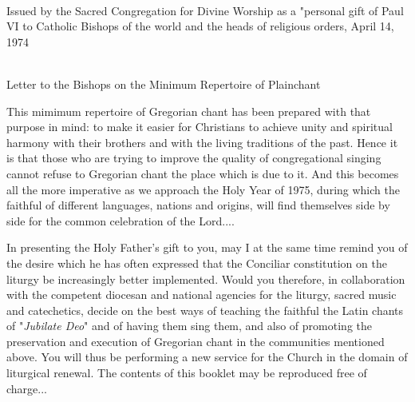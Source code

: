 \documentclass[12pt, a5paper]{book}
\begin{document}
\def\greinitialformat#1{%
{\fontsize{43}{43}\selectfont #1}%
}


\begin{center}
\\
\vspace{1in}

{\large Issued by the Sacred Congregation for Divine Worship as a "personal gift of Paul VI to Catholic Bishops of the world and the heads of religious orders, April 14, 1974}\\

\end{center}
\newpage
\begin{center}
\\
\vspace{5mm}
Letter to the Bishops on the Minimum Repertoire of Plainchant
\end{center}

This mimimum repertoire of Gregorian chant has been prepared with that purpose in mind: to make it easier for Christians to achieve unity and spiritual harmony with their brothers and with the living traditions of the past. Hence it is that those who are trying to improve the quality of congregational singing cannot refuse to Gregorian chant the place which is due to it. And this becomes all the more imperative as we approach the Holy Year of 1975, during which the faithful of different languages, nations and origins, will find themselves side by side for the common celebration of the Lord....
\par
In presenting the Holy Father's gift to you, may I at the same time remind you of the desire which he has often expressed that the Conciliar constitution on the liturgy be increasingly better implemented. Would you therefore, in collaboration with the competent diocesan and national agencies for the liturgy, sacred music and catechetics, decide on the best ways of teaching the faithful the Latin chants of "{\it Jubilate Deo}" and of having them sing them, and also of promoting the preservation and execution of Gregorian chant in the communities mentioned above. You will thus be performing a new service for the Church in the domain of liturgical renewal. The contents of this booklet may be reproduced free of charge...
\newpage
\end{document}
